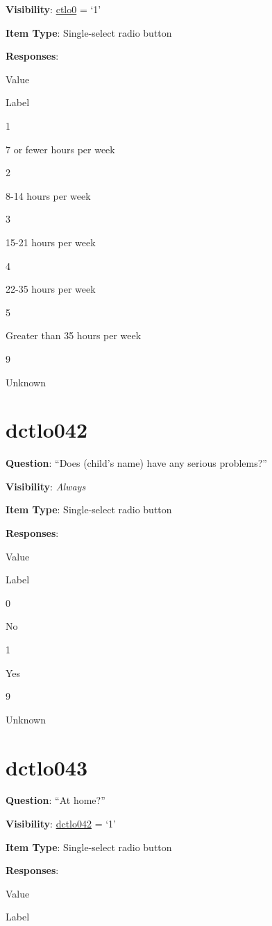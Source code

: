 \documentclass[]{book}
\begin{document}
\textbf{Visibility}: \protect\hyperlink{ctlo0}{ctlo0} = `1'

\textbf{Item Type}: Single-select radio button

\textbf{Responses}:

Value

Label

1

7 or fewer hours per week

2

8-14 hours per week

3

15-21 hours per week

4

22-35 hours per week

5

Greater than 35 hours per week

9

Unknown

\hypertarget{dctlo042}{%
\section{dctlo042}\label{dctlo042}}

\textbf{Question}: ``Does (child's name) have any serious problems?''

\textbf{Visibility}: \emph{Always}

\textbf{Item Type}: Single-select radio button

\textbf{Responses}:

Value

Label

0

No

1

Yes

9

Unknown

\hypertarget{dctlo043}{%
\section{dctlo043}\label{dctlo043}}

\textbf{Question}: ``At home?''

\textbf{Visibility}: \protect\hyperlink{dctlo042}{dctlo042} = `1'

\textbf{Item Type}: Single-select radio button

\textbf{Responses}:

Value

Label
\end{document}
